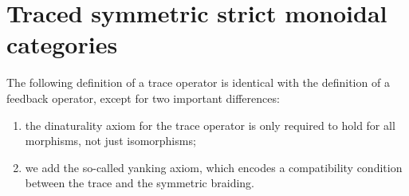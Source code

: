 
\section{Traced symmetric strict monoidal categories}



The following definition of a trace operator is identical with the definition of a feedback operator, except for two important differences:
\begin{enumerate}
    \item the dinaturality axiom for the trace operator is only required to hold for all morphisms, not just isomorphisms;
    \item we add the so-called yanking axiom, which encodes a compatibility condition between the trace and the symmetric braiding. 
\end{enumerate}


